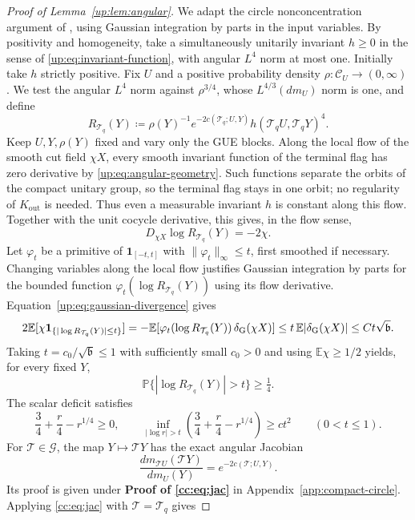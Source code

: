 \documentclass[11pt]{article}
\numberwithin{equation}{section}
\theoremstyle{remark}
\newcommand{\E}{\mathbb E}
\newcommand{\Prob}{\mathbb P}
\begin{document}
\begin{proof}[Proof of Lemma~\ref{up:lem:angular}]
We adapt the circle nonconcentration argument of
\cite[Proposition~2.6 and Claims~2.7--2.8]{Drogin}, using Gaussian
integration by parts in the input variables. By positivity and
homogeneity, take a simultaneously unitarily invariant $h\ge0$
in the sense of \eqref{up:eq:invariant-function}, with angular
$L^4$ norm at most one. Initially take $h$ strictly positive.
Fix $U$ and a positive probability density
$\rho:\mathcal C_U\to(0,\infty)$. We test the angular $L^4$ norm
against $\rho^{3/4}$, whose $L^{4/3}(dm_U)$ norm is one, and define
\[
 R_{\mathcal T_q}(Y)\coloneqq
 \rho(Y)^{-1} e^{-2c(\mathcal T_q;U,Y)}h(\mathcal T_q U,\mathcal T_q Y)^4.
\]
Keep $U,Y,\rho(Y)$ fixed and vary only the GUE blocks. Along the local
flow of the smooth cut field $\chi X$, every smooth invariant
function of the terminal flag has zero derivative by
\eqref{up:eq:angular-geometry}. Such functions separate the orbits
of the compact unitary group, so the terminal flag stays in one orbit;
no regularity of $K_{\mathrm{out}}$ is needed. Thus even a measurable
invariant $h$ is constant along this flow. Together with
the unit cocycle derivative, this gives, in the flow sense,
\[
 D_{\chi X}\log R_{\mathcal T_q}(Y)=-2\chi.
\]
Let $\varphi_t$ be a primitive of $\mathbf1_{[-t,t]}$ with
$\|\varphi_t\|_\infty\le t$, first smoothed if necessary.
Changing variables along the local flow justifies Gaussian integration
by parts for the bounded function $\varphi_t(\log R_{\mathcal T_q}(Y))$ using its
flow derivative. Equation~\eqref{up:eq:gaussian-divergence} gives
\[
 2\E[\chi\mathbf1_{\{|\log R_{\mathcal T_q}(Y)|\le t\}}]
 =-\E[\varphi_t(\log R_{\mathcal T_q}(Y))\,\delta_{\rm G}(\chi X)]
 \le t\,\E|\delta_{\rm G}(\chi X)|
 \le Ct\sqrt{\mathfrak b}.
\]
Taking $t=c_0/\sqrt{\mathfrak b}\le1$ with sufficiently small
$c_0>0$ and using $\E\chi\ge1/2$ yields, for every fixed $Y$,
\[
 \Prob\{|\log R_{\mathcal T_q}(Y)|>t\}\ge\tfrac14.
\]
The scalar deficit satisfies
\[
 \frac34+\frac r4-r^{1/4}\ge0,\qquad
 \inf_{|\log r|>t}\left(\frac34+\frac r4-r^{1/4}\right)
 \ge ct^2\qquad(0<t\le1).
\]
For $\mathcal T\in\mathcal G$, the map $Y\mapsto \mathcal T Y$ has the exact angular Jacobian
\begin{equation}\label{cc:eq:jac}
 \frac{dm_{\mathcal T U}(\mathcal T Y)}{dm_U(Y)}=e^{-2c(\mathcal T;U,Y)}.
\end{equation}
Its proof is given under \textbf{Proof of \eqref{cc:eq:jac}} in
Appendix~\ref{app:compact-circle}.
Applying \eqref{cc:eq:jac} with $\mathcal T=\mathcal T_q$ gives

\end{proof}
\end{document}
